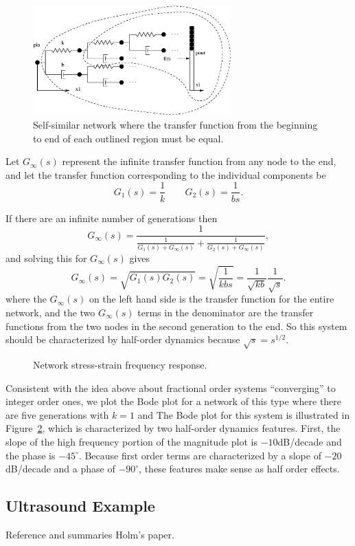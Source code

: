 \begin{figure}
  \centering
  \includegraphics[width=3in]{figs/structure3}
  \caption{Self-similar network where the transfer function from the beginning to end of each outlined region must be equal.}
  \label{fig:selfsimilar}
\end{figure}

Let $G_\infty(s)$ represent the infinite transfer function from any node to the end, and let the transfer function corresponding to the individual components be
\begin{equation}
  G_1(s) = \frac{1}{k} \qquad G_2(s) = \frac{1}{bs}.
  \label{eq:selfsimilarbuild}
\end{equation}

If there are an infinite number of generations then
\[
  G_\infty(s) = \frac{1}{\frac{1}{G_1(s) + G_\infty(s)} +
  \frac{1}{G_2(s) + G_\infty(s)}},
\]
and solving this for $G_\infty(s)$ gives
\[
  G_\infty(s) = \sqrt{G_1(s) G_2(s)} =\sqrt{\frac{1}{k b s }} = \frac{1}{\sqrt{kb}} \frac{1}{\sqrt{s}}.
\] 
where the $G_\infty(s)$ on the left hand side is the transfer function for the entire network, and the two $G_\infty(s)$ terms in the denominator are the transfer functions from the two nodes in the second generation to the end. So this system should be characterized by half-order dynamics because $\sqrt{s} = s^{1/2}$.

\begin{figure}
  \centering
  
  \caption{Network stress-strain frequency response.}
  \label{fig:bodeelement}
\end{figure}

Consistent with the idea above about fractional order systems ``converging'' to integer order ones, we plot the Bode plot for a network of this type where there are five generations with $k =1$ and The Bode plot for this system is illustrated in Figure~\ref{fig:bodeelement}, which is characterized by two half-order dynamics features. First, the slope of the high frequency portion of the magnitude plot is $-10$dB/decade and the phase is $-45^\circ$. Because first order terms are characterized by a slope of $-20$dB/decade and a phase of $-90^\circ$, these features make sense as half order effects.

\subsection{Ultrasound Example}
Reference and summaries Holm's paper.

